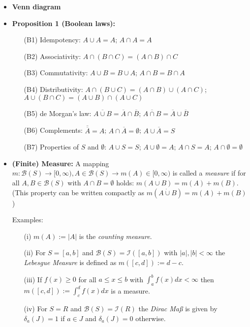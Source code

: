 \documentclass[11pt]{article}
\begin{document}
\begin{itemize}
\item {\bf Venn diagram} 

\item {\bf Proposition 1 (Boolean laws):} 
\begin{itemize}
\item[(B1)] Idempotency: $A \cup A = A$;   \hspace{.5cm} $A \cap A = A$
\item[(B2)] Associativity: $A \cap (B\cap C) = (A\cap B) \cap C$  
\item[(B3)] Commutativity: $A \cup B = B \cup A$;    \hspace{.5cm}  $A \cap B = B \cap A$
\item[(B4)] Distributivity: $A \cap (B\cup C)  = (A \cap B) \cup (A \cap C)$; \hspace{.5cm}  $A \cup (B\cap C)  = (A \cup B) \cap (A \cup C)$
\item[(B5)] de Morgan's law:  $\overline{A \cup B} = \overline{A} \cap \overline{B} $;    \hspace{.5cm}  $\overline{A \cap B} = \overline{A} \cup \overline{B} $
\item[(B6)] Complements: $ \overline{ \overline{A}} =  A$; \hspace{.5cm}  $A \cap \overline{A} = \emptyset$; \hspace{.5cm}  $A \cup \overline{A} = S$
\item[(B7)] Properties of $S$ and $ \emptyset$: \hspace{.2cm} $A \cup S = S$; \hspace{.5cm} $A \cup \emptyset = A$; \hspace{.5cm} $A \cap S = A$; \hspace{.5cm} $A \cap \emptyset = \emptyset$

\end{itemize}


\item {\bf (Finite) Measure:} A mapping $m: \mathcal{B}(S) \rightarrow [0, \infty), A\in  \mathcal{B}(S) \to m(A) \in [0, \infty)$ is called a {\it measure} if for all $A,B \in \mathcal{B}(S)$ with $A\cap B = \emptyset$ holds: $m(A\cup B) = m(A) + m(B)$.\\(This property can be written compactly as $m(A\dot\cup B) = m(A) + m(B)$)

Examples:
\begin{itemize}
\item[(i)] $m(A) := |A|$ is the {\it counting measure}.
\item[(ii)] For $S=[a,b]$ and $\mathcal{B}(S)=\mathcal{I}([a,b])$ with $|a|, |b| < \infty$ the {\it Lebesgue Measure} is defined as $m([c, d]) := d-c$.
\item[(iii)] If $f(x) \ge 0$ for all $a \le x \le b$ with $\int_a^b f(x) dx <\infty$ then $m([c, d]) := \int_c^d f(x) dx $ is a measure.
\item[(iv)] For $S=R$ and $\mathcal{B}(S)=\mathcal{I}(R)$ the {\it Dirac Ma\ss} is given by $\delta_a(J) = 1$ if $a\in J$ and $\delta_a(J) = 0$ otherwise.
\end{itemize}


\end{itemize}
\end{document}
